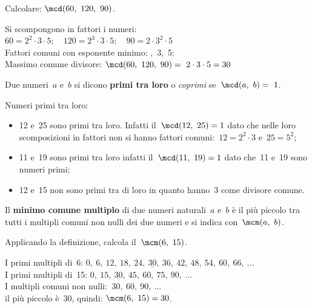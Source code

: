 \begin{esempio}{}{}
Calcolare: \quad \(\mcd(60,~120,~90)\).

Si scompongono in fattori i numeri:\\ 
\(60 = 2^2 \cdot 3 \cdot 5; 
  \quad 120 = 2^3 \cdot 3 \cdot 5; 
  \quad 90 = 2 \cdot 3^2 \cdot 5\)\\
Fattori comuni con esponente minimo: ,~3,~5:\\ 
Massimo comune divisore: \quad
\(\mcd(60,~120,~90)=~2 \cdot3 \cdot 5 = 30\)
\end{esempio}

\begin{definizione}{}{}
Due numeri~\(a\) e~\(b\) si dicono \textbf{primi tra loro} o \emph{coprimi} 
se~\(\mcd(a,~b) =~1\).
\end{definizione}

\begin{esempio}{}{}
Numeri primi tra loro:
\begin{itemize}  [leftmargin=0cm, itemindent=.5cm, noitemsep]
\item 12 e~25 sono primi tra loro. Infatti il~\(\mcd(12,~25)=1\) dato che 
nelle loro scomposizioni in fattori non si hanno fattori 
comuni:~\(12 =2^2\cdot3\) e~\(25=5^2\);
\item 11 e~19 sono primi tra loro infatti il~\(\mcd(11,~19)=1\) dato che~11 
e~19 sono numeri primi;
\item 12 e~15 non sono primi tra di loro in quanto hanno~3 come divisore 
comune.
\end{itemize}
\end{esempio}

\begin{definizione}{}{}
Il \textbf{minimo comune multiplo} di due numeri naturali~\(a\) e~\(b\) è 
il più piccolo tra tutti i multipli comuni non nulli dei due numeri 
e si indica con~\(\mcm(a,~b)\).
\end{definizione}

\begin{esempio}{}{}
Applicando la definizione, calcola il~\(\mcm(6,~15)\).

I primi multipli di~6: \quad 
\(0,~6,~12,~18,~24,~\underline{30},~36,~42,~48,~54,~60,~66,~\dots\)\\
I primi multipli di~15: \quad 
\(0,~15,~\underline{30},~45,~60,~75,~90,~\dots\)\\
I multipli comuni non nulli: \quad \(~30,~60,~90,~\dots\)\\
il più piccolo è~30, quindi: \quad \(\mcm(6,~15) = 30\). 
\end{esempio}

